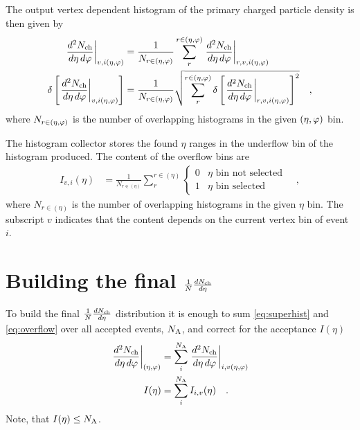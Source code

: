 \documentclass[11pt]{article}
\newcommand{\mult}[1][]{\ensuremath N_{\text{ch}#1}}
\newcommand{\dndetadphi}[1][]{{\ensuremath%
    \ifx|#1|\else\left.\fi%
    \frac{d^2\mult{}}{d\eta\,d\varphi}%
    \ifx|#1|\else\right|_{#1}\fi%
}}
\newcommand{\dndeta}[1][]{{\ensuremath%
    \ifx|#1|\else\left.\fi%
    \frac{1}{N}\frac{d\mult{}}{d\eta}%
    \ifx|#1|\else\right|_{#1}\fi%
}}
\newcommand{\N}[2]{{\ensuremath N_{#1#2}}}
\newcommand{\NA}{\N{\text{A}}{}}
\newcommand{\etaphi}{\ensuremath(\eta,\varphi)}
\begin{document}
The output vertex dependent histogram of the primary
charged particle density is then given by
\begin{align}
  \label{eq:superhist}
  \dndetadphi[v,i\etaphi] &=
  \frac{1}{N_{r\in\etaphi}}\sum_{r}^{r\in\etaphi}  
  \dndetadphi[r,v,i\etaphi]\\
  \delta\left[\dndetadphi[v,i\etaphi]\right] &=
  \frac{1}{N_{r\in\etaphi}}\sqrt{\sum_{r}^{r\in\etaphi}   
    \delta\left[\dndetadphi[r,v,i\etaphi]\right]^2}
  \quad,
\end{align}
where $N_{r\in\etaphi}$ is the number of overlapping histograms
in the given $\etaphi$ bin. 

The histogram collector stores the found $\eta$ ranges in the
underflow bin of the histogram produced.  The content of the overflow
bins are 
\begin{align}
  \label{eq:overflow}
  I_{v,i}(\eta) &= 
  \frac{1}{N_{r\in(\eta)}}
  \sum_{r}^{r\in(\eta)} \left\{\begin{array}{cl} 
      0 & \eta \text{\ bin not selected}\\ 
      1 & \eta \text{\ bin selected}
      \end{array}\right.\quad,
\end{align}
where $N_{r\in(\eta)}$ is the number of overlapping histograms in the
given $\eta$ bin.  The subscript $v$ indicates that the content
depends on the current vertex bin of event $i$.

\section{Building the final $\dndeta$}
\label{sec:ana_aod}

To build the final $\dndeta$ distribution it is enough to sum
\eqref{eq:superhist} and \eqref{eq:overflow} over all accepted
events, $\NA$, and correct for the acceptance $I(\eta)$ 
\begin{align}
  \dndetadphi[\etaphi] &= \sum_i^{\NA}\dndetadphi[i,v\etaphi]\\ 
  I(\eta) &= \sum_i^{\NA}I_{i,v}(\eta)\quad.
\end{align}
Note, that $I(\eta)\le\NA$.  
\end{document}

